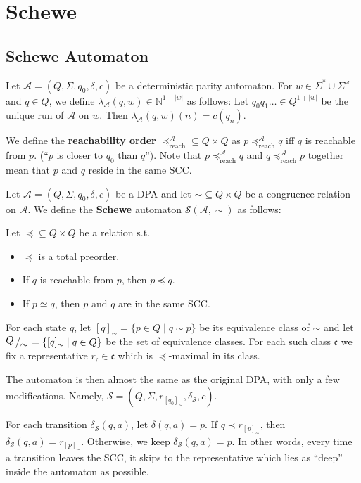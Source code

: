 
\section{Schewe}

\subsection{Schewe Automaton}

\begin{defn}
	Let $\mathcal{A} = (Q, \Sigma, q_0, \delta, c)$ be a deterministic parity automaton. For $w \in \Sigma^* \cup \Sigma^\omega$ and $q \in Q$, we define $\lambda_\mathcal{A}(q, w) \in \mathbb{N}^{1+|w|}$ as follows: Let $q_0 q_1 \dots \in Q^{1+|w|}$ be the unique run of $\mathcal{A}$ on $w$. Then $\lambda_\mathcal{A}(q, w)(n) = c(q_n)$.
	
	We define the \textbf{reachability order} $\preceq_\text{reach}^\mathcal{A} \subseteq Q \times Q$ as $p \preceq_\text{reach}^\mathcal{A} q$ iff $q$ is reachable from $p$. (\enquote{$p$ is closer to $q_0$ than $q$}). Note that $p \preceq_\text{reach}^\mathcal{A} q$ and $q \preceq_\text{reach}^\mathcal{A} p$ together mean that $p$ and $q$ reside in the same SCC.
\end{defn}

\begin{defn}
	Let $\mathcal{A} = (Q, \Sigma, q_0, \delta, c)$ be a DPA and let $\sim \subseteq Q \times Q$ be a congruence relation on $\mathcal{A}$. We define the \textbf{Schewe} automaton $\mathcal{S}(\mathcal{A}, \sim)$ as follows:
	
	Let $\preceq \subseteq Q \times Q$ be a relation s.t.
	\begin{itemize}
		\item $\preceq$ is a total preorder.
		\item If $q$ is reachable from $p$, then $p \preceq q$.
		\item If $p \simeq q$, then $p$ and $q$ are in the same SCC.
	\end{itemize}
	
	For each state $q$, let $[q]_\sim = \{ p \in Q \mid q \sim p \}$ be its equivalence class of $\sim$ and let $\bigslant{Q}{\sim} = \{[q]_\sim \mid q \in Q\}$ be the set of equivalence classes. For each such class $\mathfrak{c}$ we fix a representative $r_\mathfrak{c} \in \mathfrak{c}$ which is $\preceq$-maximal in its class.
	
	The automaton is then almost the same as the original DPA, with only a few modifications. Namely, $\mathcal{S} = (Q, \Sigma, r_{[q_0]_\sim}, \delta_\mathcal{S}, c)$.
	
	For each transition $\delta_\mathcal{S}(q, a)$, let $\delta(q, a) = p$. If $q \prec r_{[p]_\sim}$, then $\delta_\mathcal{S}(q, a) = r_{[p]_\sim}$. Otherwise, we keep $\delta_\mathcal{S}(q, a) = p$. In other words, every time a transition leaves the SCC, it skips to the representative which lies as \enquote{deep} inside the automaton as possible.
\end{defn}

